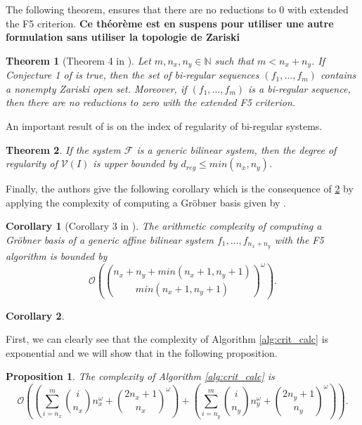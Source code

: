 \documentclass[english]{article}
\newtheorem{proposition}{Proposition}[section]
\newtheorem{theorem}{Theorem}[section]
\newtheorem{corollary}{Corollary}[section]
\begin{document}
		The following theorem, ensures that there are no reductions to 0 with extended the F5 criterion. \textbf{Ce théorème est en suspens pour utiliser une autre formulation sans utiliser la topologie de Zariski}
		
		\begin{theorem}[Theorem 4 in \cite{FSS11}]
			Let $m, n_x, n_y \in \mathbb{N}$ such that $m < n_x + n_y$. If Conjecture 1 of \cite{FSS11} is true, then the set of bi-regular sequences $(f_1,...,f_m)$ contains a nonempty Zariski open set. Moreover, if $(f_1,...,f_m)$ is a bi-regular sequence, then there are no reductions to zero with the extended F5 criterion.
		\end{theorem}
		
		An important result of \cite{FSS11} is on the index of regularity of bi-regular systems.
		
		\begin{theorem}\label{reg_bi}
			If the system $\mathcal{F}$ is a generic bilinear system, then the degree of regularity of $\mathcal{V}(I)$ is upper bounded by $d_{reg} \leq min(n_x, n_y)$.
		\end{theorem}
		
		Finally, the authors give the following corollary which is the consequence of \ref{reg_bi} by applying the complexity of computing a Gröbner basis given by \cite{Bardet04}.
		
		\begin{corollary}[Corollary 3 in \cite{FSS11}]\label{complex_bi}
			The arithmetic complexity of computing a Gröbner basis of a generic affine bilinear system $f_1,...,f_{n_x + n_y}$ with the F5 algorithm is bounded by
			$$\mathcal{O}\left(\binom{n_x + n_y + min(n_x + 1, n_y + 1)}{min(n_x + 1, n_y + 1)}^\omega\right).$$
		\end{corollary}
		
		\begin{corollary}
			
		\end{corollary}
		
		First, we can clearly see that the complexity of Algorithm \ref{alg:crit_calc} is exponential and we will show that in the following proposition.
		
		\begin{proposition}\label{complexCrit}
			The complexity of Algorithm \ref{alg:crit_calc} is
			$$
			\mathcal{O}\left(\left(\sum_{i = n_x}^{m} \binom{i}{n_x}n_x^{\omega} + \binom{2n_x + 1}{n_x}^\omega\right) + \left(\sum_{i = n_y}^{m} \binom{i}{n_y}n_y^{\omega} + \binom{2n_y + 1}{n_y}^\omega\right)\right).
			$$
		\end{proposition}
		
\end{document}
